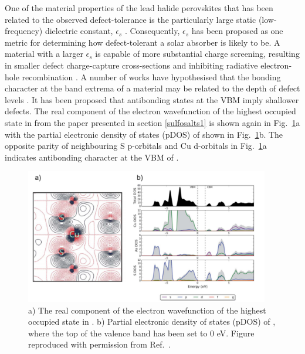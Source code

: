 \documentclass[11pt, twoside]{report}
\begin{document}
One of the material properties of the lead halide perovskites that has been related to the observed defect-tolerance is the particularly large static (low-frequency) dielectric constant, $\epsilon_s$ \cite{MIT_defect_tolerance}. Consequently, $\epsilon_s$ has been proposed as one metric for determining how defect-tolerant a solar absorber is likely to be. A material with a larger $\epsilon_s$ is capable of more substantial charge screening, resulting in smaller defect charge-capture cross-sections and inhibiting radiative electron-hole recombination \cite{beyond_MAPI}.
A number of works have hypothesised that the bonding character at the band extrema of a material may be related to the depth of defect levels \cite{MAPI_defect_phys, Andriy_defect_tolerance, MIT_defect_tolerance, MAPI_defect_phys}. It has been proposed that antibonding states at the VBM imply shallower defects. The real component of the electron wavefunction of the highest occupied state in {\enargite} from the paper presented in section \ref{sulfosalts1} \cite{sulfosalts_paper} is shown again in Fig.~\ref{enargite_bonding}a with the partial electronic density of states (pDOS) of {\enargite} shown in Fig.~\ref{enargite_bonding}b. The opposite parity of neighbouring S p-orbitals and Cu d-orbitals in Fig.~\ref{enargite_bonding}a indicates antibonding character at the VBM of {\enargite}.

\begin{figure}[h!]
    \centering
    \includegraphics[width=0.95\textwidth]{figures/enargite_bonding.png}
    \caption[a) The real component of the electron wavefunction of the highest occupied state in {\enargite}. b) Partial electronic density of states (pDOS) of {\enargite}, where the top of the valence band has been set to 0 eV.]{a) The real component of the electron wavefunction of the highest occupied state in {\enargite}. b) Partial electronic density of states (pDOS) of {\enargite}, where the top of the valence band has been set to 0 eV. Figure reproduced with permission from Ref.~.}
    \label{enargite_bonding}
\end{figure}
\end{document}
